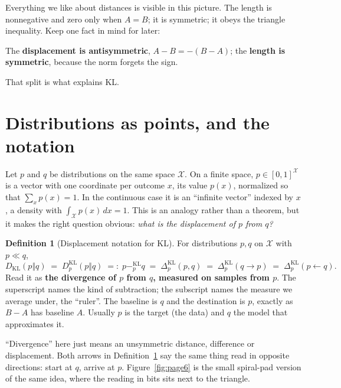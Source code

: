 \documentclass[11pt,oneside]{book}
\newcommand{\kl}[1]{\mathbin{-^{\mathrm{KL}}_{#1}}}       %
\newcommand{\DKL}{D_{\mathrm{KL}}}
\newcommand{\X}{\mathcal{X}}
\theoremstyle{definition}
\newtheorem{definition}{Definition}[chapter]
\theoremstyle{plain}
\theoremstyle{remark}
\begin{document}
Everything we like about distances is visible in this picture. The length is nonnegative and zero only when
$A=B$; it is symmetric; it obeys the triangle inequality. Keep one fact in mind for later:
\begin{tcolorbox}[keybox]
\centering The \textbf{displacement is antisymmetric}, $A-B=-(B-A)$; the \textbf{length is symmetric}, because
the norm forgets the sign.
\end{tcolorbox}
That split is what explains KL.

\section{Distributions as points, and the notation}

Let $p$ and $q$ be distributions on the same space $\X$. On a finite space, $p\in[0,1]^{\X}$ is a vector
with one coordinate per outcome $x$, its value $p(x)$, normalized so that $\sum_x p(x)=1$. In the continuous
case it is an ``infinite vector'' indexed by $x$, a density with $\int_{\X} p(x)\,dx=1$. This is an analogy
rather than a theorem, but it makes the right question obvious: \emph{what is the displacement of $p$ from $q$?}

\begin{definition}[Displacement notation for KL]\label{def:notation}
For distributions $p,q$ on $\X$ with $p\ll q$,
\[
\DKL(p\Vert q)\;=\;D^{\mathrm{KL}}_p(p\Vert q)\;=:\;p\kl{p}q
\;=\;\Delta^{\mathrm{KL}}_p(p,q)\;=\;\Delta^{\mathrm{KL}}_p(q\to p)\;=\;\Delta^{\mathrm{KL}}_p(p\leftarrow q).
\]
Read it as \textbf{the divergence of $p$ from $q$, measured on samples from $p$}. The superscript names the
kind of subtraction; the subscript names the measure we average under, the ``ruler''. The baseline is $q$
and the destination is $p$, exactly as $B-A$ has baseline $A$. Usually $p$ is the target (the data) and $q$
the model that approximates it.
\end{definition}

``Divergence'' here just means an unsymmetric distance, difference or displacement. Both arrows in
Definition~\ref{def:notation} say the same thing read in opposite directions: start at $q$, arrive at $p$.
Figure~\ref{fig:page6} is the small spiral-pad version of the same idea, where the reading in bits sits next
to the triangle.
\end{document}
